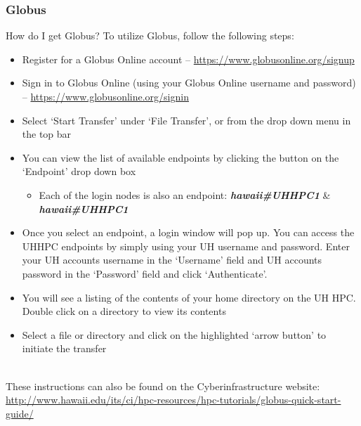 \documentclass[t,hyperref={pdfpagelabels=false}]{beamer}
\newcommand{\ci}{Cyberinfrastructure}
\begin{document}
\begin{frame}
	\frametitle{Globus}\footnotesize
\begin{block}{How do I get Globus?}
To utilize Globus, follow the following steps:
\begin{itemize}\tiny
\item Register for a Globus Online account -- \url{https://www.globusonline.org/signup}
\item Sign in to Globus Online (using your Globus Online username and password) -- \url{https://www.globusonline.org/signin}
\item Select ‘Start Transfer’ under ‘File Transfer’, or from the drop down menu in the top bar
\item You can view the list of available endpoints by clicking the button on the ‘Endpoint’ drop down box
\begin{itemize}\tiny
 \item Each of the login nodes is also an endpoint: \textbf{\emph{hawaii\#UHHPC1}} \& \textbf{\emph{hawaii\#UHHPC1}}
\end{itemize}
\item Once you select an endpoint, a login window will pop up. You can access the UHHPC endpoints by simply using your UH username and password. Enter your UH accounts username in the ‘Username’ field and UH accounts password in the ‘Password’ field and click ‘Authenticate’. 
\item You will see a listing of the contents of your home directory on the UH HPC. Double click on a directory to view its contents
\item Select a file or directory and click on the highlighted ‘arrow button’ to initiate the transfer
\end{itemize}
\end{block}
~\\
These instructions can also be found on the {\ci} website:~\\
{\footnotesize \href{http://www.hawaii.edu/its/ci/hpc-resources/hpc-tutorials/globus-quick-start-guide/}{http://www.hawaii.edu/its/ci/hpc-resources/hpc-tutorials/globus-quick-start-guide/}}
\end{frame}
\end{document}
